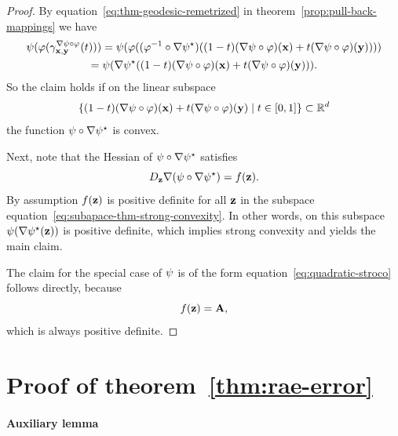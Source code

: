 \begin{proof}
    By equation~\eqref{eq:thm-geodesic-remetrized} in theorem~\ref{prop:pull-back-mappings} we have
    \begin{multline}
        \psi(\varphi(\gamma^{\nabla \psi \circ \varphi}_{\mathbf{x}, \mathbf{y}}(t))) = \psi(\varphi((\varphi^{-1} \circ\nabla \psi^\star) ((1 - t)(\nabla \psi \circ \varphi)(\mathbf{x}) + t (\nabla \psi \circ \varphi)(\mathbf{y}))))\\
        = \psi(\nabla \psi^\star((1 - t)(\nabla \psi \circ \varphi)(\mathbf{x}) + t (\nabla \psi \circ \varphi)(\mathbf{y}))).
    \end{multline}
    So the claim holds if on the linear subspace
    \begin{equation}
        \{(1 - t)(\nabla \psi \circ \varphi)(\mathbf{x}) + t (\nabla \psi \circ \varphi)(\mathbf{y}) \mid t \in [0,1]\} \subset \mathbb{R}^d
        \label{eq:subapace-thm-strong-convexity}
    \end{equation}
    the function $\psi \circ \nabla \psi^\star$ is convex. 

    Next, note that the Hessian of $\psi \circ \nabla \psi^\star$ satisfies
    \begin{equation}
        D_{\mathbf{z}} \nabla (\psi \circ \nabla \psi^\star) = f(\mathbf{z}).
    \end{equation}
    By assumption $f(\mathbf{z})$ is positive definite for all $\mathbf{z}$ in the subspace equation~\eqref{eq:subapace-thm-strong-convexity}. In other words, on this subspace $\psi(\nabla \psi^\star(\mathbf{z}))$ is positive definite, which implies strong convexity and yields the main claim.  

    The claim for the special case of $\psi$ is of the form equation~\eqref{eq:quadratic-stroco} follows directly, because
    \begin{equation}
        f(\mathbf{z}) = \mathbf{A},
    \end{equation}
    which is always positive definite.
    
\end{proof}

\section{Proof of theorem~\ref{thm:rae-error}}
\label{app:proof-of-rae-error}

\paragraph{Auxiliary lemma}

